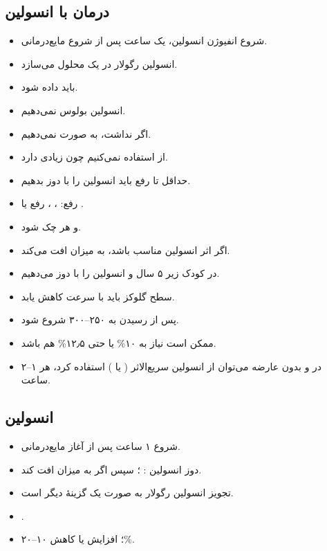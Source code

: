 \documentclass[12pt,a4paper]{article}
\begin{document}
\subsection*{درمان با انسولین}
\begin{itemize}
\item شروع انفیوژن انسولین، یک ساعت پس از شروع مایع‌درمانی.
\item {} انسولین رگولار در  یک محلول  می‌سازد.
\item باید  داده شود.
\item انسولین بولوس نمی‌دهیم.
\item اگر  نداشت، به صورت  نمی‌دهیم. 
\item از  استفاده نمی‌کنیم چون  زیادی دارد.
\item حداقل تا رفع  باید انسولین را با دوز  بدهیم.
\item رفع: ، ، رفع  یا .
\item {} و  هر  چک شود.
\item اگر اثر انسولین مناسب باشد،  به میزان  افت می‌کند.
\item در کودک زیر ۵ سال و  انسولین را با دوز  می‌دهیم.
\item سطح گلوکز باید با سرعت  کاهش یابد.
\item {} پس از رسیدن  به ۲۵۰–۳۰۰ شروع شود.
\item ممکن است نیاز به ۱۰\% یا حتی ۱۲٫۵\% هم باشد.
\item در  و  بدون عارضه می‌توان از انسولین  سریع‌الاثر ( یا ) استفاده کرد، هر ۱–۲ ساعت.
\end{itemize}

\subsection*{انسولین }
\begin{itemize}
\item شروع ۱ ساعت پس از آغاز مایع‌درمانی.
\item دوز انسولین : ؛ سپس  اگر  به میزان  افت کند.
\item تجویز انسولین رگولار به صورت  یک گزینهٔ دیگر است.
\item {}.
\item {}؛ افزایش یا کاهش ۱۰–۲۰\%.
\end{itemize}
\end{document}
